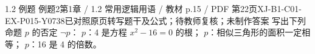 \par\noindent\begin{minipage}{\linewidth}
\begin{bankitem}{1.2 例题 例题2}{第1章 / 1.2 常用逻辑用语 / 教材 p.15 / PDF 第22页}{XJ-B1-C01-EX-P015-Y0738}{已对照原页转写题干及公式；待教师复核；未制作答案}
写出下列命题 $p$ 的否定 $\neg p$：
$p$：4 是方程 $x^2-16=0$ 的根；
$p$：相似三角形的面积一定相等；
$p$：16 是 4 的倍数。
\end{bankitem}
\end{minipage}\par\medskip

